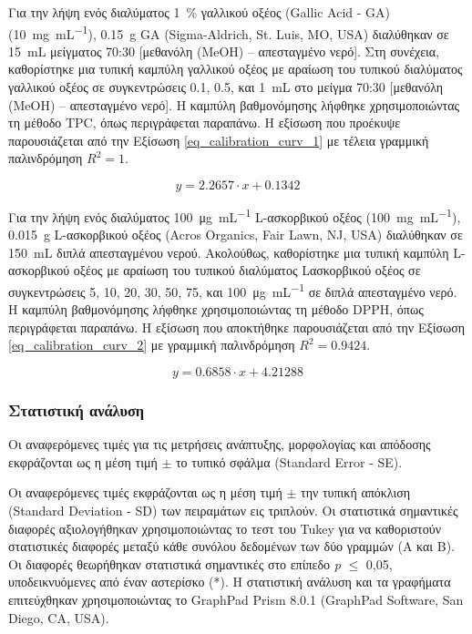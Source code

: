 \documentclass[12pt, a4paper]{report} %
\newcommand{\english}{\foreignlanguage{english}}
\begin{document}
Για την λήψη ενός διαλύματος \SI{1}{\percent} γαλλικού οξέος (\english{Gallic Acid - GA}) 
(\SI{10}{\milli\gram\per\milli\liter}), \SI{0.15}{\gram} \english{GA (Sigma-Aldrich, St. Luis, MO, USA)} διαλύθηκαν 
σε \SI{15}{\milli\liter} μείγματος 70:30 [μεθανόλη (\english{MeOH}) – απεσταγμένο νερό]. Στη συνέχεια, καθορίστηκε μια 
τυπική καμπύλη γαλλικού οξέος με αραίωση του τυπικού διαλύματος γαλλικού οξέος σε συγκεντρώσεις 0.1, 0.5, και 
\SI{1}{\milli\liter} στο μείγμα 70:30 [μεθανόλη (\english{MeOH}) – απεσταγμένο νερό]. Η καμπύλη βαθμονόμησης λήφθηκε 
χρησιμοποιώντας τη μέθοδο \english{TPC}, όπως περιγράφεται παραπάνω. Η εξίσωση που προέκυψε παρουσιάζεται από την 
Εξίσωση \ref{eq_calibration_curv_1} με τέλεια γραμμική παλινδρόμηση \english{$R^2 = 1$}.

\begin{equation}
    y = 2.2657 \cdot x + 0.1342
    \label{eq_calibration_curv_1}
\end{equation}

Για την λήψη ενός διαλύματος \SI{100}{\micro\gram\per\milli\liter} \english{L}-ασκορβικού οξέος 
(\SI{100}{\milli\gram\per\milli\liter}), \SI{0.015}{\gram} \english{L}-ασκορβικού οξέος 
(\english{Acros Organics, Fair Lawn, NJ, USA}) διαλύθηκαν σε \SI{150}{\milli\liter} διπλά απεσταγμένου νερού. 
Ακολούθως, καθορίστηκε μια τυπική καμπύλη \english{L}-ασκορβικού οξέος με αραίωση του τυπικού διαλύματος 
\english{L}ασκορβικού οξέος σε συγκεντρώσεις 5, 10, 20, 30, 50, 75, και \SI{100}{\micro\gram\per\milli\liter} σε 
διπλά απεσταγμένο νερό. Η καμπύλη βαθμονόμησης λήφθηκε χρησιμοποιώντας τη μέθοδο \english{DPPH}, όπως περιγράφεται 
παραπάνω. Η εξίσωση που αποκτήθηκε παρουσιάζεται από την Εξίσωση \ref{eq_calibration_curv_2} με γραμμική παλινδρόμηση \english{$R^2 = 0.9424$}.

\begin{equation}
    y = 0.6858 \cdot x + 4.21288
    \label{eq_calibration_curv_2}
\end{equation}

\subsubsection{Στατιστική ανάλυση}\label{subsub_str_statistics}

Οι αναφερόμενες τιμές για τις μετρήσεις ανάπτυξης, μορφολογίας και απόδοσης εκφράζονται ως η μέση τιμή $\pm$ το τυπικό 
σφάλμα (\english{Standard Error - SE}).

Οι αναφερόμενες τιμές εκφράζονται ως η μέση τιμή $\pm$ την τυπική απόκλιση (\english{Standard Deviation - SD}) 
των πειραμάτων εις τριπλούν. Οι στατιστικά σημαντικές διαφορές αξιολογήθηκαν χρησιμοποιώντας το τεστ του \english{Tukey} 
για να καθοριστούν στατιστικές διαφορές μεταξύ κάθε συνόλου δεδομένων των δύο γραμμών (A και B). Οι διαφορές θεωρήθηκαν 
στατιστικά σημαντικές στο επίπεδο \english{\emph{p} $\leq$} 0,05, υποδεικνυόμενες από έναν αστερίσκο (*). Η στατιστική 
ανάλυση και τα γραφήματα επιτεύχθηκαν χρησιμοποιώντας το 
\english{GraphPad Prism 8.0.1 (GraphPad Software, San Diego, CA, USA)}.
\end{document}
